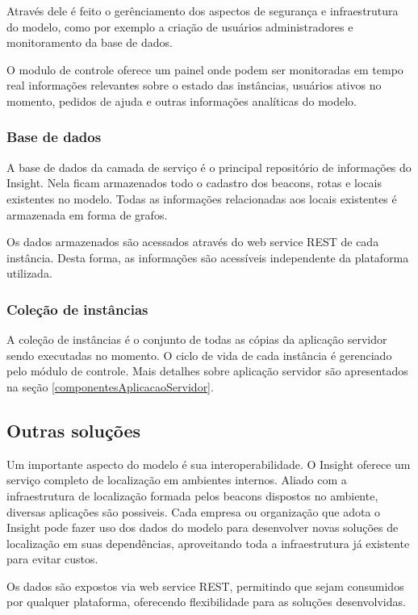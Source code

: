 \documentclass[english,brazilian]{UNISINOSmonografia}
\begin{document}
Através dele é feito o gerênciamento dos aspectos de segurança e infraestrutura do modelo, como por exemplo a criação de usuários administradores e monitoramento da base de dados.

O modulo de controle oferece um painel onde podem ser monitoradas em tempo real informações relevantes sobre o estado das instâncias, usuários ativos no momento, pedidos de ajuda e outras informações analíticas do modelo. 

	\subsubsection{Base de dados}
A base de dados da camada de serviço é o principal repositório de informações do Insight. Nela ficam armazenados todo o cadastro dos beacons, rotas e locais existentes no modelo. Todas as informações relacionadas aos locais existentes é armazenada em forma de grafos.

Os dados armazenados são acessados através do web service REST de cada instância. Desta forma, as informações são acessíveis independente da plataforma utilizada.

	\subsubsection{Coleção de instâncias}
A coleção de instâncias é o conjunto de todas as cópias da aplicação servidor sendo executadas no momento. 
O ciclo de vida de cada instância é gerenciado pelo módulo de controle.
Mais detalhes sobre aplicação servidor são apresentados na seção \ref{componentesAplicacaoServidor}.

	\subsection{Outras soluções}
Um importante aspecto do modelo é sua interoperabilidade. O Insight oferece um serviço completo de localização em ambientes internos. Aliado com a infraestrutura de localização formada pelos beacons dispostos no ambiente, diversas aplicações são possiveis. Cada empresa ou organização que adota o Insight pode fazer uso dos dados do modelo para desenvolver novas soluções de localização em suas dependências, aproveitando toda a infraestrutura já existente para evitar custos. 

Os dados são expostos via web service REST, permitindo que sejam consumidos por qualquer plataforma, oferecendo flexibilidade para as soluções desenvolvidas. 
\end{document}
